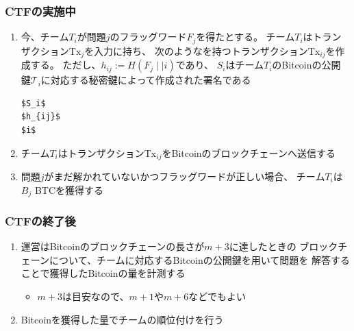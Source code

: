 \begin{frame}[fragile]
  \frametitle{CTFの実施中}

  \pause
  \begin{enumerate}
    \item<+-> 今、チーム$T_i$が問題$j$のフラッグワード$F_j$を得たとする。
    チーム$T_i$はトランザクション$\text{Tx}_{j}$を入力に持ち、
    次のような\ScriptSig を持つトランザクション$\text{Tx}_{ij}$を作成する。
    ただし、$h_{ij} := H(F_j \mid\mid i)$であり、
    $S_i$はチーム$T_i$のBitcoinの公開鍵$\mathcal{T}_i$に対応する秘密鍵によって作成された署名である
\begin{lstlisting}[style=bitcoin-script, caption={$\text{Tx}_{ij}$の\ScriptSig}]
$S_i$
$h_{ij}$
$i$
\end{lstlisting}

    \item<+-> チーム$T_i$はトランザクション$\text{Tx}_{ij}$をBitcoinのブロックチェーンへ送信する
    \item<+-> 問題$j$がまだ解かれていないかつフラッグワードが正しい場合、
    チーム$T_i$は$B_j$ BTCを獲得する
  \end{enumerate}
\end{frame}

\begin{frame}
  \frametitle{CTFの終了後}

  \pause
  \begin{enumerate}
    \item<+-> 運営はBitcoinのブロックチェーンの長さが$m + 3$に達したときの
    ブロックチェーンについて、チームに対応するBitcoinの公開鍵を用いて問題を
    解答することで獲得したBitcoinの量を計測する
    \begin{itemize}
      \item $m + 3$は目安なので、$m + 1$や$m + 6$などでもよい
    \end{itemize}

    \item<+-> Bitcoinを獲得した量でチームの順位付けを行う
  \end{enumerate}
\end{frame}

